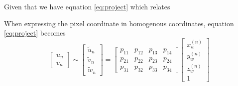 Given that we have equation \ref{eq:project} which relates 



When expressing the pixel coordinate in homogenous coordinates, equation \ref{eq:project} becomes
\begin{equation}
    \begin{bmatrix}
        u_n \\ v_n
    \end{bmatrix}
    \sim
    \begin{bmatrix}
        \widetilde{u}_n \\ \widetilde{v}_n \\ \widetilde{w}_n
    \end{bmatrix}
    =
    \begin{bmatrix}
        p_{11} & p_{12} & p_{13} & p_{14} \\
        p_{21} & p_{22} & p_{23} & p_{24} \\
        p_{31} & p_{32} & p_{33} & p_{34}
    \end{bmatrix}
    \begin{bmatrix}
        x_w^{(n)} \\ y_w^{(n)} \\ z_w^{(n)} \\ 1
    \end{bmatrix}
\end{equation}
